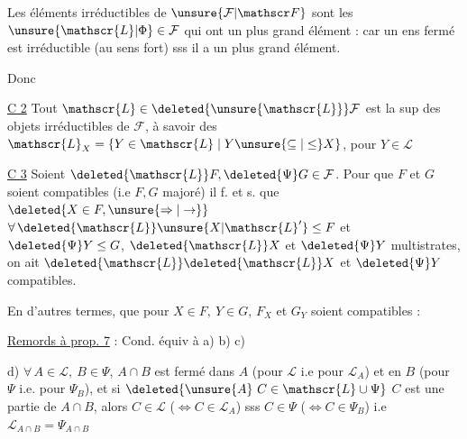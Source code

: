 Les éléments irréductibles de $\unsure{\mathcal F|\mathscr F}$ sont les $\unsure{\mathscr{L}|\Phi}\in\mathcal F$ qui ont  un plus grand élément : car un ens fermé est irréductible (au sens fort) sss il a un plus grand élément.


Donc

\uline{C 2} Tout $\mathscr{L}\in\deleted{\unsure{\mathscr{L}}}\mathcal F$ est la sup des objets irréductibles de $\mathcal F$, à savoir des $\mathscr{L}_{X}=\{Y\in\mathscr{L}\mid Y\unsure{\subseteq|\leq}X\}$, pour $Y\in\mathscr{L}$

\uline{C 3} Soient $\deleted{\mathscr{L}}F,\deleted{\Psi}G\in\mathcal F$. Pour que $F$ et $G$ soient compatibles (i.e $F,G$ majoré) il f. et s. que $\deleted{X\in F,\unsure{\Rightarrow|\to}}$ $\forall\,\deleted{\mathscr{L}}\unsure{X|{\mathscr{L}}'}\leq F$ et $\deleted{\Psi}Y\leq G$, $\deleted{\mathscr{L}}X$ et $\deleted{\Psi}Y$  multistrates, on ait $\deleted{\mathscr{L}}\deleted{\mathscr{L}}X$ et $\deleted{\Psi}Y$ compatibles.

En d'autres termes, que pour $X\in F,\ Y\in G$, $F_X$ et $G_Y$ soient compatibles :

\uline{Remords à prop.  7} : Cond. équiv à a) b) c)

d)  $\forall\,A\in\mathscr{L},\ B\in\Psi$, $A\cap B$ est fermé dans $A$ (pour $\mathscr{L}$ i.e pour $\mathscr{L}_A$) et en $B$ (pour $\Psi$ i.e. pour $\Psi_B$), et si $\deleted{\unsure{A}\ C\in\mathscr{L}\cup\Psi}$ $C$ est une partie de $A\cap B$, alors $C\in\mathscr{L}$ ($\Leftrightarrow C\in\mathscr{L}_A$) sss $C\in\Psi$ ($\Leftrightarrow C\in\Psi_B$) i.e $\mathscr{L}_{A\cap B}=\Psi_{A\cap B}$
